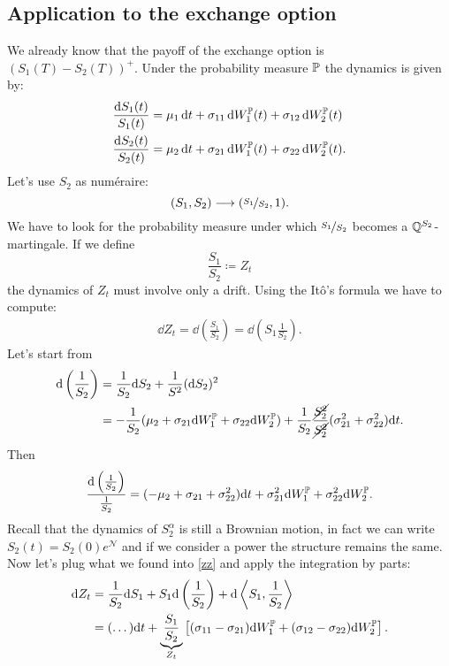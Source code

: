 \subsection{Application to the exchange option}
We already know that the payoff of the exchange option is $(S_1(T)-S_2(T))^+$. Under the probability measure $\mathbb{P}$ the dynamics is given by:
\begin{align}
    \dfrac{\dd S_1(t)}{S_1(t)} &= \mu_1\,\dd t + \sigma_{11}\,\dd W_1^{\mathbb{P}}(t) + \sigma_{12}\,\dd W_2^{\mathbb{P}}(t) \\
    \dfrac{\dd S_2(t)}{S_2(t)} &= \mu_2\,\dd t + \sigma_{21}\,\dd W_1^{\mathbb{P}}(t) + \sigma_{22}\,\dd W_2^{\mathbb{P}}(t).
\end{align}
Let's use $S_2$ as numéraire:
\begin{equation}
    (S_1,S_2)\longrightarrow(\nicefrac{S_1}{S_2}, 1).
\end{equation}
We have to look for the probability measure under which $\nicefrac{S_1}{S_2}$ becomes a $\mathbb{Q}^{S_2}$-martingale. If we define
\begin{equation}
    \frac{S_1}{S_2} \coloneqq Z_t
\end{equation}
the dynamics of $Z_t$ must involve only a drift. Using the Itô's formula we have to compute:
\begin{align}\label{zz}
    \dd Z_t = \dd\left(\frac{S_1}{S_2}\right) = \dd\left(S_1\frac{1}{S_2}\right).
\end{align}
Let's start from
\begin{align*}
    \dd\left(\frac{1}{S_2}\right) &= \dfrac{1}{S_2}\dd S_2 + \dfrac{1}{S^2}(\dd S_2)^2 \\
    &=
    -\frac{1}{S_2}(\mu_2 + \sigma_{21}\dd W_1^{\mathbb{P}} + \sigma_{22}\dd W_2^{\mathbb{P}}) + \dfrac{1}{S_2}\dfrac{\cancel{S_2^2}}{\cancel{S_2^2}}(\sigma_{21}^2+ \sigma_{22}^2)\dd t.
\end{align*}
Then
\begin{equation*}
    \frac{\dd\left(\frac{1}{S_2}\right)}{\frac{1}{S_2}} = (-\mu_2 + \sigma_{21} + \sigma_{22}^2)\dd t + \sigma_{21}^2\dd W_1^{\mathbb{P}} + \sigma_{22}^2 \dd W_2^{\mathbb{P}}.
\end{equation*}
Recall that the dynamics of $S_2^{\alpha}$ is still a Brownian motion, in fact we can write $S_2(t) = S_2(0)e^{\mathcal{N}}$ and if we consider a power the structure remains the same. Now let's plug what we found into \eqref{zz} and apply the integration by parts:
\begin{align}
    \notag \dd Z_t &= \dfrac{1}{S_2}\dd S_1 + S_1\dd \left(\frac{1}{S_2}\right) + \dd\expval{S_1,\frac{1}{S_2}} \\
    &=
    \notag (\dots)\dd t + \underbrace{\frac{S_1}{S_2}}_{Z_t}\left[(\sigma_{11}- \sigma_{21})\dd W_1^{\mathbb{P}} + (\sigma_{12}- \sigma_{22})\dd W_2^{\mathbb{P}}\right].
\end{align}
